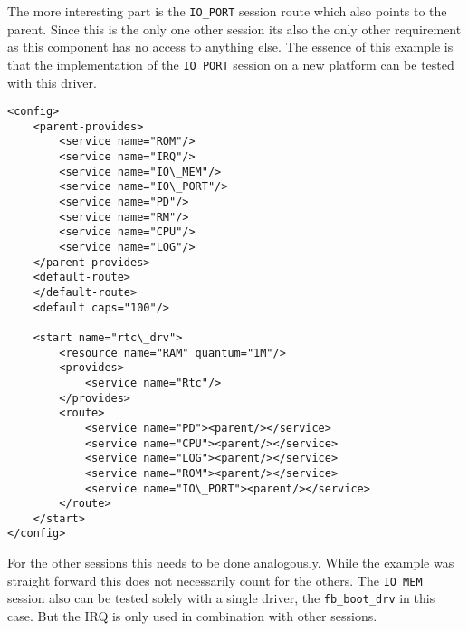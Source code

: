 \documentclass[
a4paper,
12pt,
notitlepage,
parskip=half,
DIV=11,
]{scrbook}
\begin{document}
		The more interesting part is the \texttt{IO\_PORT} session route which also points to the parent.
		Since this is the only one other session its also the only other requirement as this component has no access to anything else.
		The essence of this example is that the implementation of the \texttt{IO\_PORT} session on a new platform can be tested with this driver.
		
		\begin{lstlisting}[basicstyle=\ttfamily\footnotesize]
<config>
    <parent-provides>
        <service name="ROM"/>
        <service name="IRQ"/>
        <service name="IO\_MEM"/>
        <service name="IO\_PORT"/>
        <service name="PD"/>
        <service name="RM"/>
        <service name="CPU"/>
        <service name="LOG"/>
    </parent-provides>
    <default-route>
    </default-route>
    <default caps="100"/>

    <start name="rtc\_drv">
        <resource name="RAM" quantum="1M"/>
        <provides>
            <service name="Rtc"/>
        </provides>
        <route>
            <service name="PD"><parent/></service>
            <service name="CPU"><parent/></service>
            <service name="LOG"><parent/></service>
            <service name="ROM"><parent/></service>
            <service name="IO\_PORT"><parent/></service>
        </route>
    </start>
</config>
		\end{lstlisting}
		
		For the other sessions this needs to be done analogously.
		While the example was straight forward this does not necessarily count for the others.
		The \texttt{IO\_MEM} session also can be tested solely with a single driver, the \texttt{fb\_boot\_drv} in this case. But the IRQ is only used in combination with other sessions. 
		
	
\end{document}
